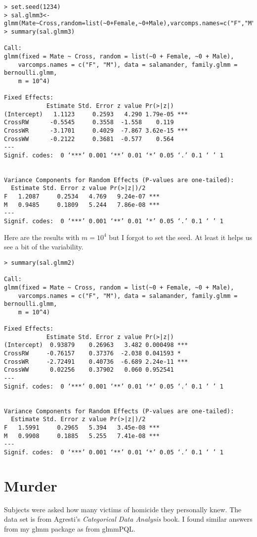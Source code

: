 \documentclass{article}
\begin{document}
\begin{verbatim}
> set.seed(1234)
> sal.glmm3<-glmm(Mate~Cross,random=list(~0+Female,~0+Male),varcomps.names=c("F","M"),data=salamander,family.glmm=bernoulli.glmm,m=10^4)
> summary(sal.glmm3)

Call:
glmm(fixed = Mate ~ Cross, random = list(~0 + Female, ~0 + Male), 
    varcomps.names = c("F", "M"), data = salamander, family.glmm = bernoulli.glmm, 
    m = 10^4)

Fixed Effects:
            Estimate Std. Error z value Pr(>|z|)    
(Intercept)   1.1123     0.2593   4.290 1.79e-05 ***
CrossRW      -0.5545     0.3558  -1.558    0.119    
CrossWR      -3.1701     0.4029  -7.867 3.62e-15 ***
CrossWW      -0.2122     0.3681  -0.577    0.564    
---
Signif. codes:  0 ‘***’ 0.001 ‘**’ 0.01 ‘*’ 0.05 ‘.’ 0.1 ‘ ’ 1


Variance Components for Random Effects (P-values are one-tailed):
  Estimate Std. Error z value Pr(>|z|)/2    
F   1.2087     0.2534   4.769   9.24e-07 ***
M   0.9485     0.1809   5.244   7.86e-08 ***
---
Signif. codes:  0 ‘***’ 0.001 ‘**’ 0.01 ‘*’ 0.05 ‘.’ 0.1 ‘ ’ 1

\end{verbatim}

Here are the results with $m=10^4$ but I forgot to set the seed. At least it helps us see a bit of the variability.
\begin{verbatim}
> summary(sal.glmm2)

Call:
glmm(fixed = Mate ~ Cross, random = list(~0 + Female, ~0 + Male), 
    varcomps.names = c("F", "M"), data = salamander, family.glmm = bernoulli.glmm, 
    m = 10^4)

Fixed Effects:
            Estimate Std. Error z value Pr(>|z|)    
(Intercept)  0.93879    0.26963   3.482 0.000498 ***
CrossRW     -0.76157    0.37376  -2.038 0.041593 *  
CrossWR     -2.72491    0.40736  -6.689 2.24e-11 ***
CrossWW      0.02256    0.37902   0.060 0.952541    
---
Signif. codes:  0 ‘***’ 0.001 ‘**’ 0.01 ‘*’ 0.05 ‘.’ 0.1 ‘ ’ 1


Variance Components for Random Effects (P-values are one-tailed):
  Estimate Std. Error z value Pr(>|z|)/2    
F   1.5991     0.2965   5.394   3.45e-08 ***
M   0.9908     0.1885   5.255   7.41e-08 ***
---
Signif. codes:  0 ‘***’ 0.001 ‘**’ 0.01 ‘*’ 0.05 ‘.’ 0.1 ‘ ’ 1
\end{verbatim}

\section{Murder}
Subjects were asked how many victims of homicide they personally knew. The data set is from Agresti's \textit{Categorical Data Analysis} book. I found similar answers from my glmm package as from glmmPQL.
\end{document}
